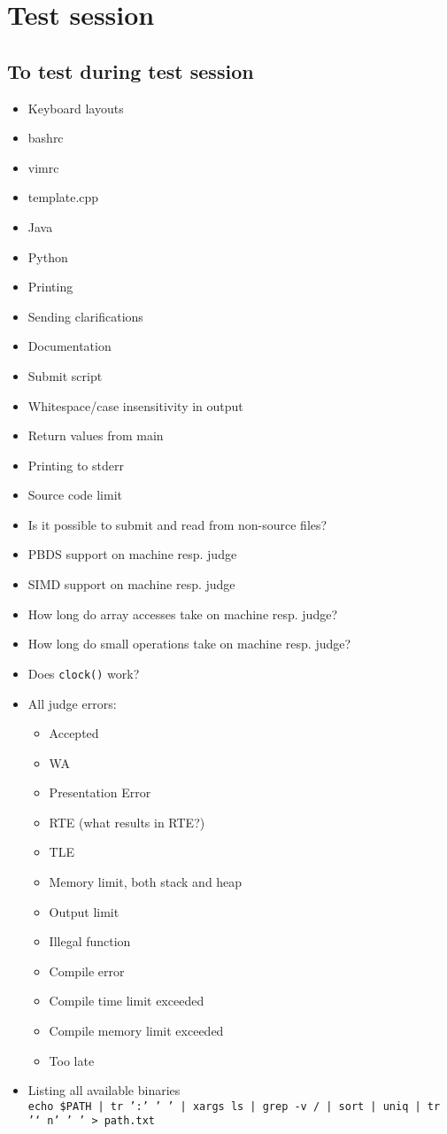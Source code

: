 \appendix
\chapter{Test session}

\section{To test during test session}
\begin{itemize}
	\item Keyboard layouts
	\item bashrc
	\item vimrc
	\item template.cpp
	\item Java
	\item Python
	\item Printing
	\item Sending clarifications
	\item Documentation
	\item Submit script
	\item Whitespace/case insensitivity in output
	\item Return values from main
	\item Printing to stderr
	\item Source code limit
	\item Is it possible to submit and read from non-source files?
  \item PBDS support on machine resp. judge
	\item SIMD support on machine resp. judge
	\item How long do array accesses take on machine resp. judge?
	\item How long do small operations take on machine resp. judge?
	\item Does \texttt{clock()} work?
	\item All judge errors:
		\begin{itemize}
			\item Accepted
			\item WA
			\item Presentation Error
			\item RTE (what results in RTE?)
			\item TLE
			\item Memory limit, both stack and heap
			\item Output limit
			\item Illegal function
			\item Compile error
			\item Compile time limit exceeded
			\item Compile memory limit exceeded
			\item Too late
		\end{itemize}
	\item Listing all available binaries\\
		\texttt{echo \$PATH | tr ':' ' ' | xargs ls | grep -v / | sort | uniq | tr '\char`\\n' ' ' > path.txt}
\end{itemize}
